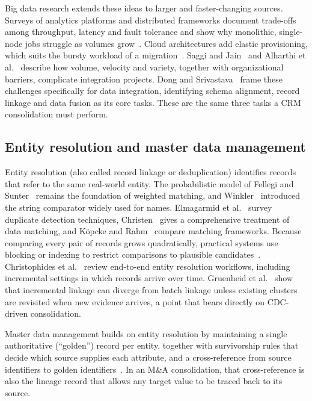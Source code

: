 Big data research extends these ideas to larger and faster-changing sources. Surveys of analytics platforms and distributed frameworks document trade-offs among throughput, latency and fault tolerance and show why monolithic, single-node jobs struggle as volumes grow~\cite{inoubli2018,singh2015}. Cloud architectures add elastic provisioning, which suits the bursty workload of a migration~\cite{khan2013}. Saggi and Jain~\cite{saggi2018} and Alharthi et al.~\cite{alharthi2017} describe how volume, velocity and variety, together with organizational barriers, complicate integration projects. Dong and Srivastava~\cite{dong2015} frame these challenges specifically for data integration, identifying schema alignment, record linkage and data fusion as its core tasks. These are the same three tasks a CRM consolidation must perform.

\subsection{Entity resolution and master data management}\label{sec:2.2}

Entity resolution (also called record linkage or deduplication) identifies records that refer to the same real-world entity. The probabilistic model of Fellegi and Sunter~\cite{fellegi1969} remains the foundation of weighted matching, and Winkler~\cite{winkler1990} introduced the string comparator widely used for names. Elmagarmid et al.~\cite{elmagarmid2007} survey duplicate detection techniques, Christen~\cite{christen2012book} gives a comprehensive treatment of data matching, and Köpcke and Rahm~\cite{kopcke2010} compare matching frameworks. Because comparing every pair of records grows quadratically, practical systems use blocking or indexing to restrict comparisons to plausible candidates~\cite{christen2012survey,papadakis2020}. Christophides et al.~\cite{christophides2020} review end-to-end entity resolution workflows, including incremental settings in which records arrive over time. Gruenheid et al.~\cite{gruenheid2014} show that incremental linkage can diverge from batch linkage unless existing clusters are revisited when new evidence arrives, a point that bears directly on CDC-driven consolidation.

Master data management builds on entity resolution by maintaining a single authoritative (``golden'') record per entity, together with survivorship rules that decide which source supplies each attribute, and a cross-reference from source identifiers to golden identifiers~\cite{loshin2009}. In an M\&A consolidation, that cross-reference is also the lineage record that allows any target value to be traced back to its source.

